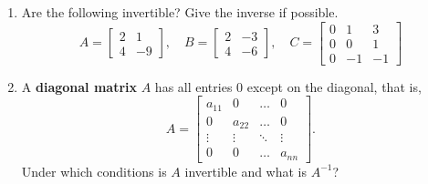 \documentclass[12pt,a4paper]{amsart}
\begin{document}
\begin{enumerate}
\item
 Are the following invertible? Give the inverse if possible. 
\[ A = \left[\begin{matrix} 2 & 1 \\ 4 & -9 \end{matrix}\right],\quad
  B = \left[\begin{matrix} 2 & -3 \\ 4 & -6 \end{matrix}\right], \quad
  C = \left[\begin{matrix} 0 & 1 & 3 \\ 0 & 0 & 1 \\ 0 & -1 & -1 \end{matrix}\right]
\]



\item
 A {\bf diagonal matrix} $A$ has all entries $0$ except on the diagonal, that is,
 \[ A = \left[\begin{matrix} a_{11} & 0 &  \dots & 0 \\ 0 & a_{22} & \dots & 0 \\ \vdots & \vdots & \ddots & \vdots \\
     0 & 0 & \dots & a_{nn} \end{matrix}\right]. \]
 Under which conditions is $A$ invertible and what is $A^{-1}$? 

\end{enumerate}
\end{document}
